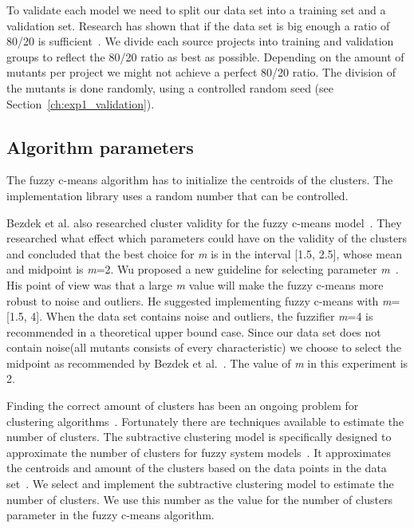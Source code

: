 \documentclass[conference,draftclsnofoot,onecolumn]{IEEEtran}
\begin{document}
To validate each model we need to split our data set into a training set and a validation set.
Research has shown that if the data set is big enough a ratio of 80/20 is sufficient~\cite{Guyon1997ARatio}.
We divide each source projects into training and validation groups to reflect the 80/20 ratio as best as possible. Depending on the amount of mutants per project we might not achieve a perfect 80/20 ratio.
The division of the mutants is done randomly, using a controlled random seed (see Section~\ref{ch:exp1_validation}).

\subsection{Algorithm parameters}
\label{ch:algorithm_parameters}
The fuzzy c-means algorithm has to initialize the centroids of the clusters. The implementation library uses a random number that can be controlled.

Bezdek et al. also researched cluster validity for the fuzzy c-means model~\cite{Bezdek1995OnModel}.
They researched what effect which parameters could have on the validity of the clusters and 
concluded that the best choice for \textit{m} is in the interval [1.5, 2.5], whose mean and midpoint is \textit{m}=2.
Wu proposed a new guideline for selecting parameter \textit{m}~\cite{Wu2012}.
His point of view was that a large \textit{m} value will make the fuzzy c-means more robust to noise and outliers.
He suggested implementing fuzzy c-means with \textit{m}=[1.5, 4].
When the data set contains noise and outliers, the fuzzifier \textit{m}=4 is recommended in a theoretical upper bound case.
Since our data set does not contain noise(all mutants consists of every characteristic) we choose to select the midpoint as recommended by Bezdek et al.~\cite{Bezdek1995OnModel}. The value of \textit{m} in this experiment is 2.

Finding the correct amount of clusters has been an ongoing problem for clustering algorithms~\cite{Du2010Clustering:Approach}.
Fortunately there are techniques available to estimate the number of clusters.
The subtractive clustering model is specifically designed to approximate the number of clusters for fuzzy system models~\cite{Chiu1994FuzzyEstimation}.
It approximates the centroids and amount of the clusters based on the data points in the data set~\cite{Chiu1994FuzzyEstimation}.
We select and implement the subtractive clustering model to estimate the number of clusters.
We use this number as the value for the number of clusters parameter in the fuzzy c-means algorithm.
\end{document}
